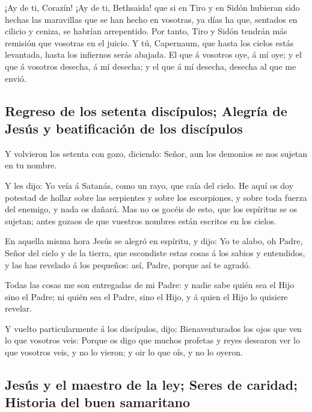  ¡Ay de ti, Corazín! ¡Ay de ti, Bethsaida! que si en Tiro
y en Sidón hubieran sido hechas las maravillas que se han hecho en
vosotras, ya días ha que, sentados en cilicio y ceniza, se habrían
arrepentido.  Por tanto, Tiro y Sidón tendrán más
remisión que vosotras en el juicio.  Y tú, Capernaum, que
hasta los cielos estás levantada, hasta los infiernos serás abajada.
 El que á vosotros oye, á mí oye; y el que á vosotros
desecha, á mí desecha; y el que á mí desecha, desecha al que me envió.

\hypertarget{regreso-de-los-setenta-discuxedpulos-alegruxeda-de-jesuxfas-y-beatificaciuxf3n-de-los-discuxedpulos}{%
\subsection{Regreso de los setenta discípulos; Alegría de Jesús y
beatificación de los
discípulos}\label{regreso-de-los-setenta-discuxedpulos-alegruxeda-de-jesuxfas-y-beatificaciuxf3n-de-los-discuxedpulos}}

 Y volvieron los setenta con gozo, diciendo: Señor, aun
los demonios se nos sujetan en tu nombre.

 Y les dijo: Yo veía á Satanás, como un rayo, que caía
del cielo.  He aquí os doy potestad de hollar sobre las
serpientes y sobre los escorpiones, y sobre toda fuerza del enemigo, y
nada os dañará.  Mas no os gocéis de esto, que los
espíritus se os sujetan; antes gozaos de que vuestros nombres están
escritos en los cielos.

 En aquella misma hora Jesús se alegró en espíritu, y
dijo: Yo te alabo, oh Padre, Señor del cielo y de la tierra, que
escondiste estas cosas á los sabios y entendidos, y las has revelado á
los pequeños: así, Padre, porque así te agradó.

 Todas las cosas me son entregadas de mi Padre: y nadie
sabe quién sea el Hijo sino el Padre; ni quién sea el Padre, sino el
Hijo, y á quien el Hijo lo quisiere revelar.

 Y vuelto particularmente á los discípulos, dijo:
Bienaventurados los ojos que ven lo que vosotros veis: 
Porque os digo que muchos profetas y reyes desearon ver lo que vosotros
veis, y no lo vieron; y oir lo que oís, y no lo oyeron.

\hypertarget{jesuxfas-y-el-maestro-de-la-ley-seres-de-caridad-historia-del-buen-samaritano}{%
\subsection{Jesús y el maestro de la ley; Seres de caridad; Historia del
buen
samaritano}\label{jesuxfas-y-el-maestro-de-la-ley-seres-de-caridad-historia-del-buen-samaritano}}

